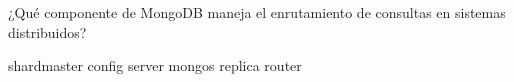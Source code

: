 \question[1] ¿Qué componente de MongoDB maneja el enrutamiento de consultas en sistemas distribuidos?
\begin{choices}
\choice shardmaster
\choice config server
\CorrectChoice mongos
\choice replica router
\end{choices}